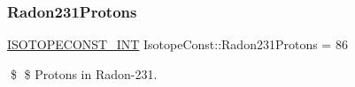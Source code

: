 \subsubsection{\texorpdfstring{Radon231\+Protons}{Radon231Protons}}
{\footnotesize\ttfamily \mbox{\hyperlink{group___isotope_const-_macros_ga5f18360b3e99483a35c32d789e62621c}{I\+S\+O\+T\+O\+P\+E\+C\+O\+N\+S\+T\+\_\+\+I\+NT}} Isotope\+Const\+::\+Radon231\+Protons = 86}

\$ \$ Protons in Radon-\/231. 